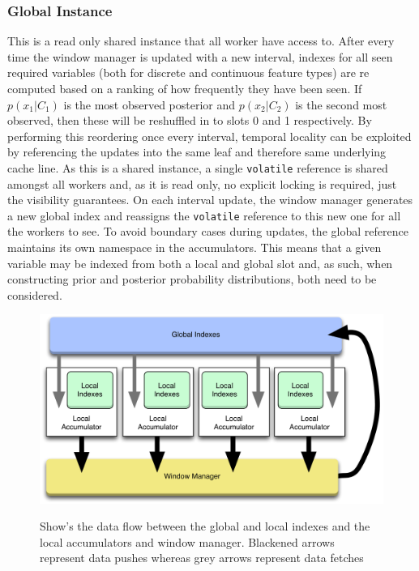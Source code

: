 \documentclass[a4paper,11pt]{scrreprt}
\begin{document}
\subsubsection{Global Instance}
This is a read only shared instance that all worker have access to. After every time the window manager is updated with a new interval, indexes for all seen required variables (both for discrete and continuous feature types) are re computed based on a ranking of how frequently they have been seen. If \(p(x_1 | C_1)\) is the most observed posterior and \(p(x_2 | C_2)\) is the second most observed, then these will be reshuffled in to slots 0 and 1 respectively. By performing this reordering once every interval, temporal locality can be exploited by referencing the updates into the same leaf and therefore same underlying cache line. As this is a shared instance, a single \texttt{volatile} reference is shared amongst all workers and, as it is read only, no explicit locking is required, just the visibility guarantees. On each interval update, the window manager generates a new global index and reassigns the \texttt{volatile} reference to this new one for all the workers to see. To avoid boundary cases during updates, the global reference maintains its own namespace in the accumulators. This means that a given variable may be indexed from both a local and global slot and, as such, when constructing prior and posterior probability distributions, both need to be considered.

\begin{figure}[h!]
\centering
\caption{Show's the data flow between the global and local indexes and the local accumulators and window manager. Blackened arrows represent data pushes whereas grey arrows represent data fetches}
\includegraphics[scale=0.35, trim=0 0 0 12, clip=true] {indexes.pdf}
\label{fig:indexes}
\end{figure}
\end{document}
